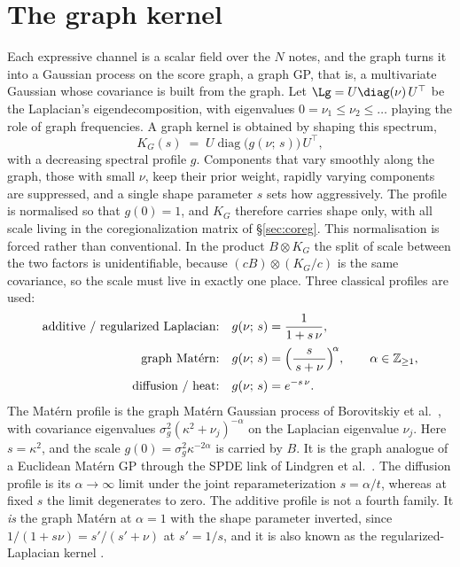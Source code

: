 \section{The graph kernel}\label{sec:graphgp}
Each expressive channel is a scalar field over the $N$ notes, and the graph
turns it into a Gaussian process on the score graph, a graph GP, that is, a
multivariate Gaussian whose covariance is built from the graph. Let
$\Lg = U \diag(\nu)\, U^\top$ be the Laplacian's eigendecomposition, with
eigenvalues $0 = \nu_1 \le \nu_2 \le \dots$ playing the role of graph
frequencies. A graph kernel is obtained by shaping this spectrum,
\begin{equation}
  K_G(s) \;=\; U \operatorname{diag}\bigl(g(\nu;\, s)\bigr)\, U^\top,
  \label{eq:spectral}
\end{equation}
with a decreasing spectral profile $g$. Components that vary smoothly along
the graph, those with small $\nu$, keep their prior weight, rapidly varying
components are suppressed, and a single shape parameter $s$ sets how
aggressively. The profile is normalised so that $g(0) = 1$, and $K_G$
therefore carries shape only, with all scale living in the coregionalization
matrix of \S\ref{sec:coreg}. This normalisation is forced rather than
conventional. In the product $B \otimes K_G$ the split of scale between the
two factors is unidentifiable, because $(cB) \otimes (K_G/c)$ is the same
covariance, so the scale must live in exactly one place. Three classical
profiles are used:
\begin{align}
  \text{additive / regularized Laplacian:}\quad & g(\nu;\, s) = \frac{1}{1 + s\,\nu},
  \label{eq:additive}\\[2pt]
  \text{graph Mat\'ern:}\quad & g(\nu;\, s) = \Bigl(\frac{s}{\,s + \nu\,}\Bigr)^{\!\alpha},
  \qquad \alpha \in \mathbb{Z}_{\ge 1},
  \label{eq:matern}\\[2pt]
  \text{diffusion / heat:}\quad & g(\nu;\, s) = e^{-s\,\nu}.
  \label{eq:diffusion}
\end{align}
The Mat\'ern profile is the graph Mat\'ern Gaussian process of Borovitskiy
et al.\ \cite{borovitskiy2021}, with covariance eigenvalues
$\sigma_g^{2}(\kappa^2 + \nu_j)^{-\alpha}$ on the Laplacian eigenvalue
$\nu_j$. Here $s = \kappa^2$, and the scale
$g(0) = \sigma_g^2 \kappa^{-2\alpha}$ is carried by $B$. It is the graph
analogue of a Euclidean Mat\'ern GP through the SPDE link of Lindgren et
al.\ \cite{lindgren2011}. The diffusion profile is its $\alpha \to \infty$
limit under the joint reparameterization $s = \alpha/t$, whereas at fixed $s$
the limit degenerates to zero. The additive profile is not a fourth family.
It \emph{is} the graph Mat\'ern at $\alpha = 1$ with the shape parameter
inverted, since $1/(1+s\nu) = s'/(s'+\nu)$ at $s' = 1/s$, and it is also
known as the regularized-Laplacian kernel \cite{smolakondor2003}.

